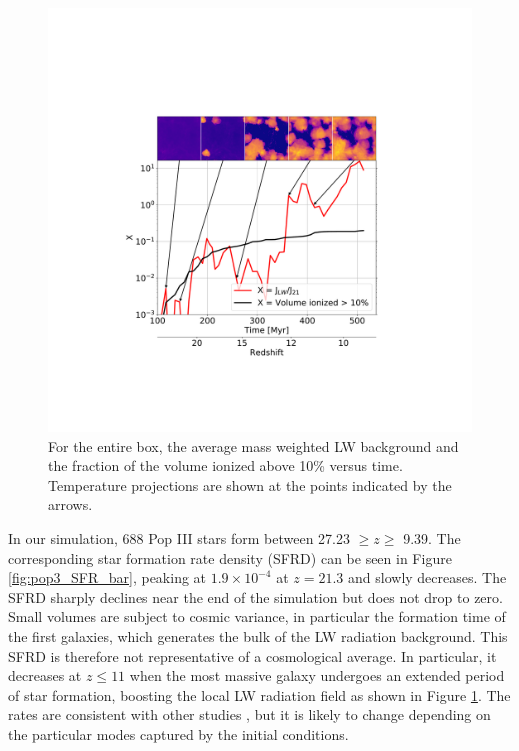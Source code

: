 \documentclass[a4paper,fleqn,usenatbib]{mnras}
\begin{document}
\begin{figure}
	\includegraphics[width=\columnwidth]{images/JLW_xe_mass.pdf}
    \caption{For the entire box, the average mass weighted LW background and the fraction of the volume ionized above 10\% versus time. Temperature projections are shown at the points indicated by the arrows.}
    \label{fig:JLW_xe_mass}
\end{figure}

In our simulation, 688 Pop III stars form between 27.23 $\geq z \geq$ 9.39. The corresponding star formation rate density (SFRD) can be seen in Figure \ref{fig:pop3_SFR_bar}, peaking at $1.9 \times 10^{-4}$ at $z = 21.3$ and slowly decreases. The SFRD sharply declines near the end of the simulation but does not drop to zero. Small volumes are subject to cosmic variance, in particular the formation time of the first galaxies, which generates the bulk of the LW radiation background.  This SFRD is therefore not representative of a cosmological average.  In particular, it decreases at $z \le 11$ when the most massive galaxy undergoes an extended period of star formation, boosting the local LW radiation field as shown in Figure \ref{fig:JLW_xe_mass}.  The rates are consistent with other studies \citep[e.g.][]{Xu13, Magg16}, but it is likely to change depending on the particular modes captured by the initial conditions.
\end{document}
